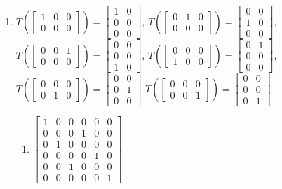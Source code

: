 \documentclass[12pt]{article}
\begin{document}
\begin{enumerate}
\begin{enumerate}
    \end{enumerate}

    \setcounter{enumi}{50}

  \item $T\left( \begin{bmatrix} 1 & 0 & 0\\ 0 & 0 & 0 \end{bmatrix} \right)=\begin{bmatrix} 1 & 0\\0 & 0\\ 0 &0\end{bmatrix}$, $T\left( \begin{bmatrix} 0 & 1 & 0\\ 0 & 0 & 0 \end{bmatrix} \right)=\begin{bmatrix} 0 & 0\\1 & 0\\ 0 &0\end{bmatrix}$, $T\left( \begin{bmatrix} 0 & 0 & 1\\ 0 & 0 & 0 \end{bmatrix} \right)=\begin{bmatrix} 0 & 0\\0 & 0\\ 1 &0\end{bmatrix}$, $T\left( \begin{bmatrix} 0 & 0 & 0\\ 1 & 0 & 0 \end{bmatrix} \right)=\begin{bmatrix} 0 & 1\\0 & 0\\ 0 &0\end{bmatrix}$, $T\left( \begin{bmatrix} 0 & 0 & 0\\ 0 & 1 & 0 \end{bmatrix} \right)=\begin{bmatrix} 0 & 0\\0 & 1\\ 0 &0\end{bmatrix}$ $T\left( \begin{bmatrix} 0 & 0 & 0\\ 0 & 0 & 1 \end{bmatrix} \right)=\begin{bmatrix} 0 & 0\\0 & 0\\ 0 &1\end{bmatrix}$

    \begin{enumerate}

      \item $\begin{bmatrix} 1 & 0 & 0 & 0 & 0 & 0\\ 0 & 0 & 0 &1 & 0 & 0\\ 0 & 1 & 0 & 0 & 0 & 0\\ 0 & 0 & 0 & 0 & 1 & 0\\ 0 & 0 & 1 & 0 & 0 & 0\\ 0 & 0 & 0 & 0 & 0 & 1\end{bmatrix}$

    \end{enumerate}

\end{enumerate}
\end{document}

